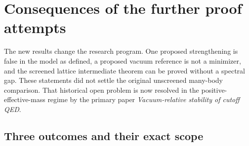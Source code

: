 \section{Consequences of the further proof attempts}
\label{next-status}

The new results change the research program. One proposed strengthening
is false in the model as defined, a proposed vacuum reference is not a
minimizer, and the screened lattice intermediate theorem can be proved
without a spectral gap. These statements did not settle the original
unscreened many-body comparison. That historical open problem is now
resolved in the positive-effective-mass regime by the primary paper
\emph{Vacuum-relative stability of cutoff QED}.

\subsection{Three outcomes and their exact scope}

